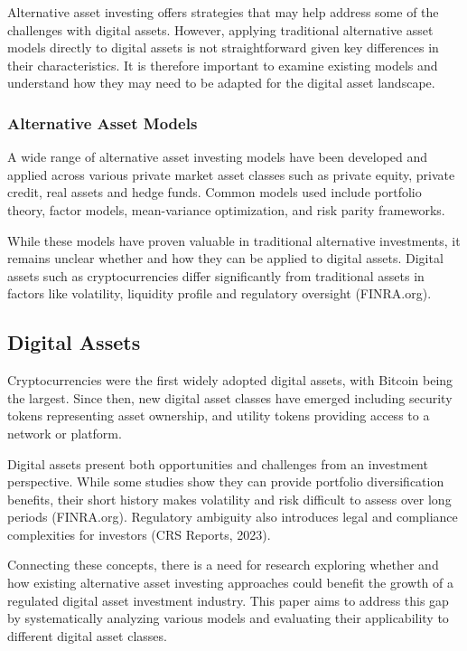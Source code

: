 \documentclass{ledger}
\begin{document}
Alternative asset investing offers strategies that may help address some of the challenges with digital assets. However, applying traditional alternative asset models directly to digital assets is not straightforward given key differences in their characteristics. It is therefore important to examine existing models and understand how they may need to be adapted for the digital asset landscape.

\subsubsection{Alternative Asset Models}
A wide range of alternative asset investing models have been developed and applied across various private market asset classes such as private equity, private credit, real assets and hedge funds. Common models used include portfolio theory, factor models, mean-variance optimization, and risk parity frameworks.

While these models have proven valuable in traditional alternative investments, it remains unclear whether and how they can be applied to digital assets. Digital assets such as cryptocurrencies differ significantly from traditional assets in factors like volatility, liquidity profile and regulatory oversight (FINRA.org).

\subsection {Digital Assets}
Cryptocurrencies were the first widely adopted digital assets, with Bitcoin being the largest. Since then, new digital asset classes have emerged including security tokens representing asset ownership, and utility tokens providing access to a network or platform.

Digital assets present both opportunities and challenges from an investment perspective. While some studies show they can provide portfolio diversification benefits, their short history makes volatility and risk difficult to assess over long periods (FINRA.org). Regulatory ambiguity also introduces legal and compliance complexities for investors (CRS Reports, 2023).

Connecting these concepts, there is a need for research exploring whether and how existing alternative asset investing approaches could benefit the growth of a regulated digital asset investment industry. This paper aims to address this gap by systematically analyzing various models and evaluating their applicability to different digital asset classes.
\end{document}
